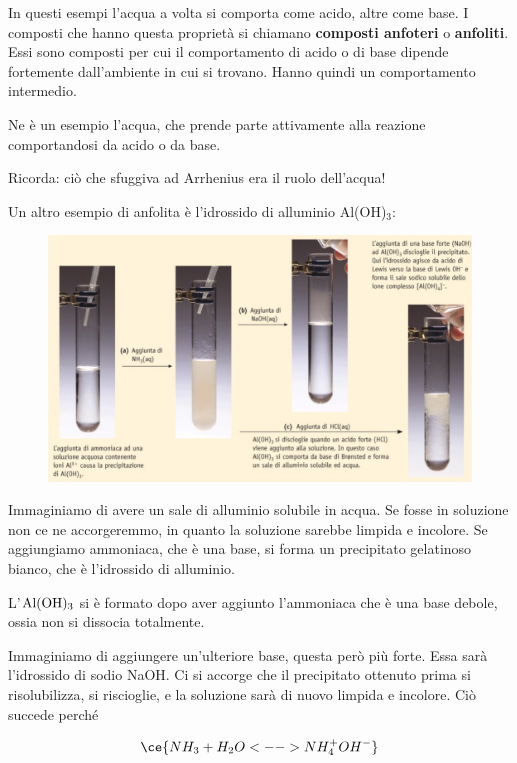 \vspace{0.2cm}In questi esempi l'acqua a volta si comporta come acido, altre come base. I composti che hanno questa proprietà si chiamano \textbf{composti anfoteri} o \textbf{anfoliti}. Essi sono composti per cui il comportamento di acido o di base dipende fortemente dall'ambiente in cui si trovano. Hanno quindi un comportamento intermedio.

Ne è un esempio l'acqua, che prende parte attivamente alla reazione comportandosi da acido o da base.

\vspace{0.2cm}Ricorda: ciò che sfuggiva ad Arrhenius era il ruolo dell'acqua!

\vspace{0.2cm}Un altro esempio di anfolita è l'idrossido di alluminio Al(OH)$_3$:

\begin{figure}[htp]
    \centering
    \includegraphics[width=12cm]{immagini/anfoliti.png}
\end{figure}

Immaginiamo di avere un sale di alluminio solubile in acqua. Se fosse in soluzione non ce ne accorgeremmo, in quanto la soluzione sarebbe limpida e incolore. Se aggiungiamo ammoniaca, che è una base, si forma un precipitato gelatinoso bianco, che è l'idrossido di alluminio.

L'$\rm Al(OH)_3$ si è formato dopo aver aggiunto l'ammoniaca che è una base debole, ossia non si dissocia totalmente.

Immaginiamo di aggiungere un'ulteriore base, questa però più forte. Essa sarà l'idrossido di sodio NaOH. Ci si accorge che il precipitato ottenuto prima si risolubilizza, si riscioglie, e la soluzione sarà di nuovo limpida e incolore. Ciò succede perché

$$\ce{NH_3 + H_2O <--> NH_4^+ OH^-}$$


